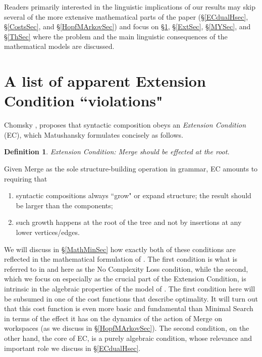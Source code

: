 \documentclass[12pt]{amsart}
\newtheorem{defn}[prop]{Definition}
\numberwithin{equation}{section}
\begin{document}
Readers primarily interested in the linguistic implications of our results
may skip several of the more extensive mathematical parts of the paper
(\S \ref{ECdualHsec}, \S \ref{CostsSec}, and \S \ref{HopfMArkovSec}) 
and focus on \S \ref{ECsec}, \S \ref{ExtSec}, \S \ref{MYSec}, and \S \ref{ThSec} 
where the problem and the main 
linguistic consequences of the mathematical models are discussed. 


\smallskip
\section{A list of apparent Extension Condition ``violations"} \label{ECsec} 

Chomsky \cite{Chomsky93}, \cite{Chomsky95} proposes that syntactic 
composition obeys an {\em Extension Condition} (EC), which Matushansky \cite{Matu} 
formulates concisely as follows.

\begin{defn}\label{ECdef}
{\rm Extension Condition}: Merge should be effected at the root. 
\end{defn}

Given Merge as the sole structure-building operation in grammar, EC amounts to 
requiring that 
\begin{enumerate}
\item syntactic compositions always ``grow" or expand structure; the result 
should be larger than the components; 
\item such growth happens at the
root of the tree and not by insertions at any lower vertices/edges. 
\end{enumerate}
We will discuss in \S \ref{MathMinSec} how exactly both of these conditions are 
reflected in the mathematical formulation of \cite{MCB}. The first condition is what
is referred to in \cite{MCB} and here as the No Complexity Loss condition, while the
second, which we focus on especially as the crucial part of the Extension Condition,
is intrinsic in the algebraic properties of the model of \cite{MCB}. The first condition here
will be subsumed in one of the cost functions that describe optimality. It will turn out
that this cost function is even more basic and fundamental than Minimal Search
in terms of the effect it has on the dynamics of the action of Merge on workspaces
(as we discuss in \S \ref{HopfMArkovSec}). The second condition, on the other hand,
the core of EC, is a purely algebraic condition, whose relevance and important role
we discuss in \S \ref{ECdualHsec}. 
\end{document}
